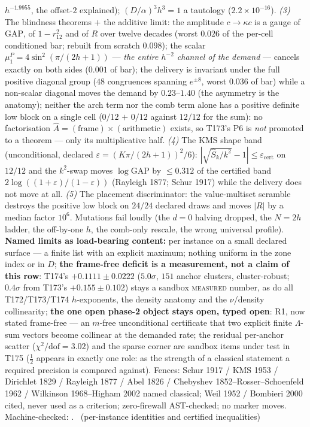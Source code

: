 $h^{-1.9955}$, the offset-$2$ explained); $(D/\alpha)^3h^3=1$ a
tautology ($2.2\times10^{-16}$).
\emph{(3)} The blindness theorems $+$ the additive limit: the amplitude
$c\to\kappa c$ is a gauge of $\mathrm{GAP}$, of $1-r_{12}^2$ and of $R$
over twelve decades (worst $0.026$ of the per-cell conditioned bar;
rebuilt from scratch $0.098$); the scalar
$\mu^P_1=4\sin^2(\pi/(2h+1))$ --- \emph{the entire $h^{-2}$ channel of
the demand} --- cancels exactly on both sides ($0.001$ of bar); the
delivery is invariant under the full positive diagonal group ($48$
congruences spanning $e^{\pm8}$, worst $0.036$ of bar) while a
non-scalar diagonal moves the demand by $0.23$--$1.40$ (the asymmetry
is the anatomy); neither the arch term nor the comb term alone has a
positive definite low block on a single cell ($0/12$ $+$ $0/12$ against
$12/12$ for the sum): no factorisation
$\hat A=(\mathrm{frame})\times(\mathrm{arithmetic})$ exists, so T173's
P6 is \emph{not} promoted to a theorem --- only its multiplicative
half.
\emph{(4)} The KMS shape band (unconditional, declared
$\varepsilon=(K\pi/(2h+1))^2/6$): $|\sqrt{\hat S_k/k^2}-1|\le
\varepsilon_{\mathrm{cert}}$ on $12/12$ and the $k^2$-swap moves
$\log\mathrm{GAP}$ by $\le0.312$ of the certified band
$2\log((1+\varepsilon)/(1-\varepsilon))$ (Rayleigh 1877; Schur 1917)
while the delivery does not move at all.
\emph{(5)} The placement discriminator: the value-multiset scramble
destroys the positive low block on $24/24$ declared draws and moves
$|R|$ by a median factor $10^{6}$. Mutations fail loudly (the $d=0$
halving dropped, the $N=2h$ ladder, the off-by-one $h$, the comb-only
rescale, the wrong universal profile).
\textbf{Named limits as load-bearing content:} per instance on a small
declared surface --- a finite list with an explicit maximum; nothing
uniform in the zone index or in $D$; \textbf{the frame-free deficit is
a measurement, not a claim of this row}: T174's $+0.1111\pm0.0222$
($5.0\sigma$, $151$ anchor clusters, cluster-robust; $0.4\sigma$ from
T173's $+0.155\pm0.102$) stays a sandbox \textsc{measured} number, as
do all T172/T173/T174 $h$-exponents, the density anatomy and the
$\nu$/density collinearity; \textbf{the one open phase-2 object stays
open, typed open}: R1, now stated frame-free --- an $m$-free
unconditional certificate that two explicit finite $\Lambda$-sum
vectors become collinear at the demanded rate; the residual per-anchor
scatter ($\chi^2/\mathrm{dof}=3.02$) and the sparse corner are sandbox
items under test in T175 ($\tfrac12$ appears in exactly one role: as
the strength of a classical statement a required precision is compared
against).
Fences: Schur 1917 / KMS 1953 / Dirichlet 1829 / Rayleigh 1877 / Abel
1826 / Chebyshev 1852--Rosser--Schoenfeld 1962 / Wilkinson 1968--Higham
2002 named classical; Weil 1952 / Bombieri 2000 cited, never used as a
criterion; zero-firewall AST-checked; no marker moves.
Machine-checked: .
\mE\ (per-instance identities and certified inequalities)


